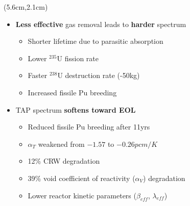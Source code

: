 \begin{frame}
\begin{textblock*}{12.4cm}
\begin{columns}
		\column[t]{6cm}
		\begin{textblock*}{7.3cm}(5.6cm,2.1cm) %
		\begin{itemize}
			\itemsep=1em
			\item<1-> \textbf{Less effective} gas removal leads to 
			\textbf{harder} 
			spectrum
			\begin{itemize}
				\itemsep=0.5em
				\item Shorter lifetime due to parasitic absorption
				\item Lower $^{235}$U fission rate
				\item Faster $^{238}$U destruction rate (-50kg)
				\item Increased fissile Pu breeding
			\end{itemize}
			
			\item<2-> TAP spectrum \textbf{softens toward EOL}
			\begin{itemize}
				\itemsep=0.5em
				\item Reduced fissile Pu breeding after 11yrs
				\item $\alpha_T$ weakened 
				from $-1.57$ to $-0.26pcm/K$
				\item 12\% CRW degradation
				\item 39\% void coefficient of reactivity ($\alpha_V$) 
				degradation
				\item Lower reactor kinetic parameters ($\beta_{eff}$, 
				$\lambda_{eff}$)
			\end{itemize} 
		\end{itemize}
	
		\end{textblock*}
	
	
	\end{columns}
\end{textblock*}
\end{frame}


